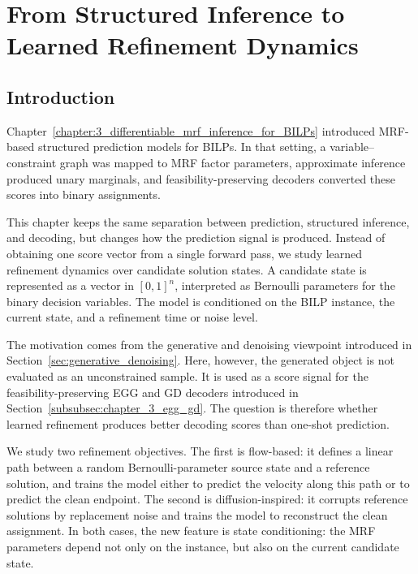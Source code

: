 \chapter{From Structured Inference to Learned Refinement Dynamics}\label{chapter:4_denoising_and_mrf_inference}

\section{Introduction}
\label{sec:chapter_4_intro}

Chapter~\ref{chapter:3_differentiable_mrf_inference_for_BILPs} introduced MRF-based structured prediction models for BILPs. In that setting, a variable--constraint graph was mapped to MRF factor parameters, approximate inference produced unary marginals, and feasibility-preserving decoders converted these scores into binary assignments.

This chapter keeps the same separation between prediction, structured inference, and decoding, but changes how the prediction signal is produced. Instead of obtaining one score vector from a single forward pass, we study learned refinement dynamics over candidate solution states. A candidate state is represented as a vector in $[0,1]^n$, interpreted as Bernoulli parameters for the binary decision variables. The model is conditioned on the BILP instance, the current state, and a refinement time or noise level.

The motivation comes from the generative and denoising viewpoint introduced in Section~\ref{sec:generative_denoising}. Here, however, the generated object is not evaluated as an unconstrained sample. It is used as a score signal for the feasibility-preserving EGG and GD decoders introduced in Section~\ref{subsubsec:chapter_3_egg_gd}. The question is therefore whether learned refinement produces better decoding scores than one-shot prediction.

We study two refinement objectives. The first is flow-based: it defines a linear path between a random Bernoulli-parameter source state and a reference solution, and trains the model either to predict the velocity along this path or to predict the clean endpoint. The second is diffusion-inspired: it corrupts reference solutions by replacement noise and trains the model to reconstruct the clean assignment. In both cases, the new feature is state conditioning: the MRF parameters depend not only on the instance, but also on the current candidate state.

